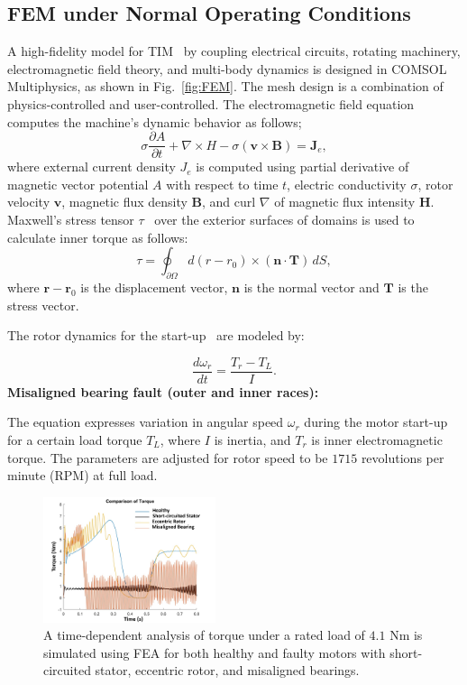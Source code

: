 \documentclass[a4paper,conference]{IEEEtran}
\begin{document}
\subsection{FEM under Normal Operating Conditions}
A high-fidelity model for TIM~\cite{kocman2016induction} by coupling electrical circuits, rotating machinery, electromagnetic field theory, and multi-body dynamics is designed in COMSOL Multiphysics, as shown in Fig.~\ref{fig:FEM}. The mesh design is a combination of physics-controlled and user-controlled. The electromagnetic field equation computes the machine's dynamic behavior as follows;
\begin{equation}
\sigma \frac{\partial A}{\partial t} + \nabla \times H - \sigma (\mathbf{v} \times \mathbf{B}) = \mathbf{J}_e,
\end{equation}
where external current density $J_e$ is computed using partial derivative of magnetic vector potential $A$ with respect to time $t$, electric conductivity $\sigma$, rotor velocity $\mathbf{v}$, magnetic flux density $\mathbf{B}$, and curl $\nabla$ of magnetic flux intensity $\mathbf{H}$.
 \\
Maxwell’s stress tensor \(\tau\)~\cite{kocman2016induction}
 over the exterior surfaces of domains is used to calculate inner torque as follows:
\begin{equation}
\tau = \oint_{\partial\Omega} d(r - r_0) \times (\mathbf{n} \cdot \mathbf{T}) \, dS,
\end{equation}
where \(\mathbf{r} - \mathbf{r}_0\) is the displacement vector, \(\mathbf{n}\) is the normal vector and \(\mathbf{T}\) is the stress vector.


The rotor dynamics for the start-up~\cite{8778128} are modeled by:


\begin{equation}
\frac{d\omega_r}{dt} = \frac{T_r - T_L}{I}.
\end{equation}
\textbf{Misaligned bearing fault (outer and inner races): }

The equation expresses variation in angular speed $\omega_r$ during the motor start-up for a certain load torque $T_L$, where $I$ is inertia, and $T_r$ is inner electromagnetic torque. The parameters are adjusted for rotor speed to be $1715$ revolutions per minute (RPM) at full load.
\begin{figure}[t!]
    \centering
    \includegraphics[width=0.45\textwidth]{Figs/UPDATE1.png }
    \caption{ A time-dependent analysis of torque under a rated load of $4.1$ Nm is simulated using FEA for both healthy and faulty motors with short-circuited stator, eccentric rotor, and misaligned bearings.}
    \label{fig:ROM}
\end{figure}
\end{document}
